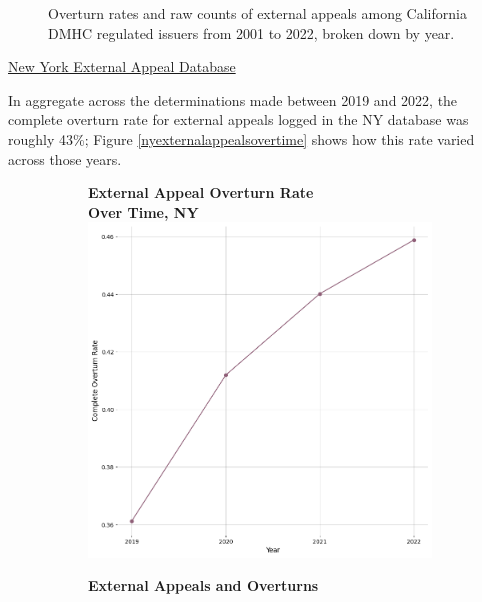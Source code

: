 \documentclass[12pt, a4paper,twoside,parskip=full]{report}
\theoremstyle{plain} %
\theoremstyle{definition} %
\theoremstyle{remark} %
\numberwithin{equation}{chapter}
\begin{document}
\begin{figure}[h!]
\begin{subfigure}[b]{0.49\textwidth}
			\end{subfigure}
			\caption{Overturn rates and raw counts of external appeals among California DMHC regulated issuers from 2001 to 2022, broken down by year.}
			\label{cadmhcexternalappealsovertime}
		\end{figure}
	
		\clearpage
	
	
		\underline{New York External Appeal Database}

		In aggregate across the determinations made between 2019 and 2022, the complete overturn rate for external appeals logged in the NY database was roughly 43\%; Figure \ref{nyexternalappealsovertime} shows how this rate varied across those years.
		
		
		\begin{figure}[h!]
			\centering
			\begin{subfigure}[b]{0.49\textwidth}
				\centering
				\textbf{External Appeal Overturn Rate}\\
				\textbf{Over Time, NY}\\
				\includegraphics[width=\textwidth]{images/nys_external/external_appeal_overturn_rates_by_year.png}
			\end{subfigure}
			\hfill
			\begin{subfigure}[b]{0.49\textwidth}
				\centering
				\textbf{External Appeals and Overturns}\\

\end{subfigure}
\end{figure}
\end{document}
